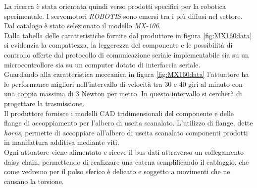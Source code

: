 \documentclass[%
corpo=11pt,
twoside,
 stile=classica,
oldstyle,
greek,%
]{toptesi}
\begin{document}
	



	La ricerca è stata orientata quindi verso prodotti specifici per la robotica sperimentale. I servomotori \textit{ROBOTIS} sono emersi tra i più diffusi nel settore. Dal catalogo è stato selezionato il modello \textit{MX-106}. \\
	Dalla tabella delle caratteristiche fornite dal produttore in figura \ref{fig:MX160data} si evidenzia la compattezza, la leggerezza del componente e le possibilità di controllo offerte dal protocollo di comunicazione seriale implementabile sia su un microcontrollore sia su un computer dotato di interfaccia seriale.\\
	Guardando alla caratteristica meccanica in figura \ref{fig:MX160data} l'attuatore ha le performance migliori nell'intervallo di velocità tra 30 e 40 giri al minuto con una coppia massima di 3 Newton per metro. In questo intervallo si cercherà di progettare la trasmissione. \\
	
	Il produttore fornisce i modelli CAD tridimensionali del componente e delle flange di accoppiamento per l'albero di uscita scanalato. L'utilizzo di flange, dette \textit{horns}, permette di accoppiare all'albero di uscita scanalato componenti prodotti in manifattura additiva mediante viti. \\
	Ogni attuatore viene alimentato e riceve il bus dati attraverso un collegamento daisy chain, permettendo di realizzare una catena semplificando il cablaggio, che come vedremo per il polso sferico è delicato e soggetto a movimenti che ne causano la torsione. 
	
\end{document}
